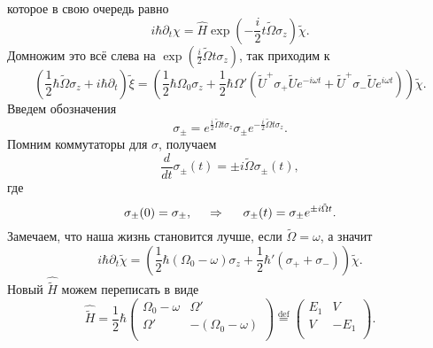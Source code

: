которое в свою очередь равно
\begin{equation*}
    i \hbar \partial_t \chi = \hat{H} \exp\left(
        - \frac{i}{2} t \tilde{\Omega} \sigma_z
    \right)  \tilde{\chi}.
\end{equation*}
Домножим это всё слева на $\exp\left(\frac{i}{2} \tilde{\Omega} t \sigma_z\right)$, так приходим к
\begin{equation*}
    \left(\frac{1}{2} \hbar \tilde{\Omega} \sigma_z + i \hbar \partial_t\right)\tilde{\xi} = \left(
        \frac{1}{2} \hbar \Omega_0 \sigma_z + \frac{1}{2} \hbar \Omega' \left(
            \tilde{U}^+ \sigma_+ \tilde{U} e^{- i \omega t} + \tilde{U}^+ \sigma_- \tilde{U} e^{i \omega t}
        \right)
    \right) \tilde{\chi}.
\end{equation*}
Введем обозначения
\begin{equation*}
    \sigma_{\pm} = e^{\frac{i}{2} \tilde{\Omega} t \sigma_z} \sigma_{\pm} e^{- \frac{i}{2} \tilde{\Omega} t \sigma_z}.
\end{equation*}
Помним коммутаторы для $\sigma$,  получаем
\begin{equation*}
    \frac{d }{d t} \sigma_{\pm} (t) = \pm i \tilde{\Omega} \sigma_{\pm} (t),
\end{equation*}
где
\begin{equation*}
    \sigma_{\pm} (0) = \sigma_{\pm},
    \hspace{0.5cm} \Rightarrow \hspace{0.5cm}
    \sigma_{\pm} (t) = \sigma_{\pm} e^{\pm i \tilde{\Omega} t}.
\end{equation*}
Замечаем, что наша жизнь становится лучше, если $\tilde{\Omega} = \omega$, а значит
\begin{equation*}
    i \hbar \partial_t \tilde{\chi} = \left(
        \frac{1}{2} \hbar \left(\Omega_0 - \omega\right) \sigma_z + \frac{1}{2} \hbar' \left(\sigma_+ + \sigma_-\right)
    \right) \tilde{\chi}.
\end{equation*}
Новый $\hat{\tilde{H}}$ можем переписать в виде
\begin{equation*}
    \hat{\tilde{H}} = \frac{1}{2} \hbar \begin{pmatrix}
        \Omega_0 - \omega & \Omega'  \\
        \Omega' & -(\Omega_0 - \omega)  \\
    \end{pmatrix} \overset{\mathrm{def}}{=} \begin{pmatrix}
        E_1 & V  \\
        V & -E_1  \\
    \end{pmatrix}.
\end{equation*}
